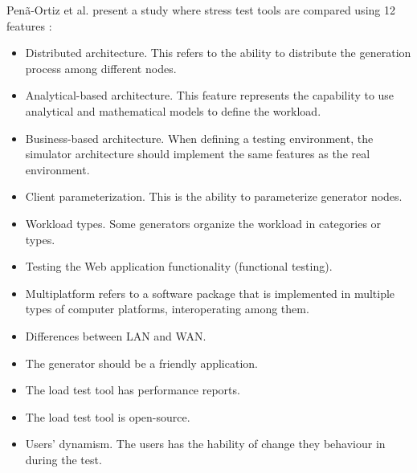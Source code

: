 \documentclass{report}
\begin{document}
Penã-Ortiz et al. present a study where stress test tools are compared using 12 features \cite{MohammadS.Obaidat}:

\begin{itemize}
\item Distributed architecture. This refers to the ability to distribute the generation process among different nodes.
\item Analytical-based architecture. This feature represents the capability to use analytical and mathematical models to define the workload. 
\item Business-based architecture. When defining a testing environment, the simulator architecture should implement the same features as the real environment.
\item Client parameterization. This is the ability to parameterize generator nodes.
\item Workload types. Some generators organize the workload in categories or types.
\item Testing the Web application functionality (functional testing).
\item Multiplatform refers to a software package that is implemented in multiple types of computer platforms, interoperating among them.
\item Differences between LAN and WAN. 
\item The generator should be a friendly application.
\item The load test tool has performance reports.
\item The load test tool is open-source.
\item Users’ dynamism. The users has the hability of change they behaviour in during the test.
\end{itemize}
\end{document}
